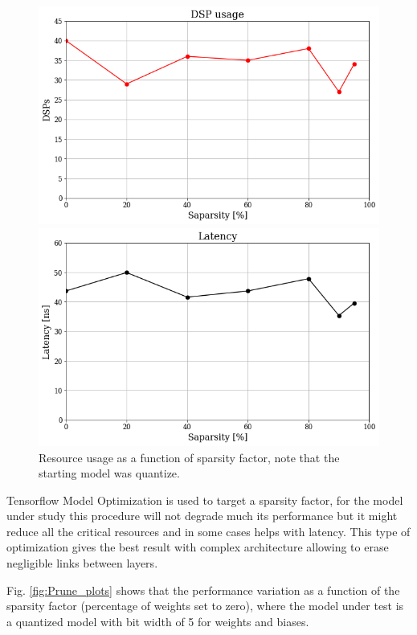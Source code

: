\documentclass[../../main.tex]{subfiles}
\begin{document}
\begin{figure}[h]
\begin{minipage}[b]{0.5\linewidth}
    \centering
    \includegraphics[width=.9\linewidth]{sections/05/Images/Prune_DSP_1ele.png} 
    \vspace{2ex}
  \end{minipage}%
  \begin{minipage}[b]{0.5\linewidth}
    \centering
    \includegraphics[width=.9\linewidth]{sections/05/Images/Prune_Lat_1ele.png}
    \vspace{2ex}
  \end{minipage}
  \caption{Resource usage as a function of sparsity factor, note that the starting model was quantize.} 
  \label{fig:prune_resource}
\end{figure}


Tensorflow Model Optimization is used to target a sparsity factor, for the model under study this procedure will not degrade much its performance but it might reduce all the critical resources and in some cases helps with latency. This type of optimization gives the best result with complex architecture allowing to erase negligible links between layers.

Fig. \ref{fig:Prune_plots} shows that the performance variation as a function of the sparsity factor (percentage of weights set to zero), where the model under test is a quantized model with bit width of 5 for weights and biases.
\end{document}
